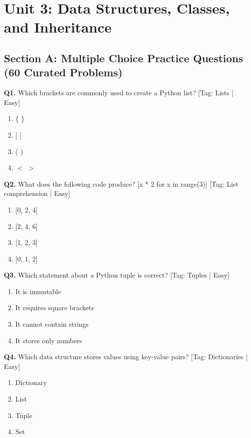 \chapter{Unit 3: Data Structures, Classes, and Inheritance}

\section{Section A: Multiple Choice Practice Questions (60 Curated Problems)}

\noindent\textbf{Q1.} Which brackets are commonly used to create a Python list? \hfill [Tag: Lists | Easy]
\begin{enumerate}[label=(\alph*),topsep=2pt,itemsep=1pt,partopsep=0pt,parsep=0pt]
    \item {\{ \}}
    \item {[ ]}
    \item {( )}
    \item {$<$ $>$}
\end{enumerate}
\vspace{2mm}
\noindent\textbf{Q2.} What does the following code produce? [x * 2 for x in range(3)] \hfill [Tag: List comprehension | Easy]
\begin{enumerate}[label=(\alph*),topsep=2pt,itemsep=1pt,partopsep=0pt,parsep=0pt]
    \item {[0, 2, 4]}
    \item {[2, 4, 6]}
    \item {[1, 2, 3]}
    \item {[0, 1, 2]}
\end{enumerate}
\vspace{2mm}
\noindent\textbf{Q3.} Which statement about a Python tuple is correct? \hfill [Tag: Tuples | Easy]
\begin{enumerate}[label=(\alph*),topsep=2pt,itemsep=1pt,partopsep=0pt,parsep=0pt]
    \item {It is immutable}
    \item {It requires square brackets}
    \item {It cannot contain strings}
    \item {It stores only numbers}
\end{enumerate}
\vspace{2mm}
\noindent\textbf{Q4.} Which data structure stores values using key-value pairs? \hfill [Tag: Dictionaries | Easy]
\begin{enumerate}[label=(\alph*),topsep=2pt,itemsep=1pt,partopsep=0pt,parsep=0pt]
    \item {Dictionary}
    \item {List}
    \item {Tuple}
    \item {Set}
\end{enumerate}
